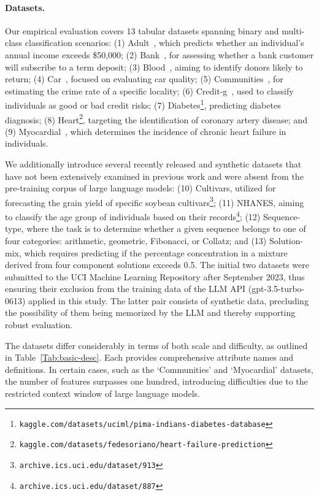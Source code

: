 \paragraph{Datasets.}
Our empirical evaluation covers 13 tabular datasets spanning binary and multi-class classification scenarios: (1) Adult~\cite{asuncion2007uci}, which predicts whether an individual’s annual income exceeds \$50,000; (2) Bank~\cite{moro2014data}, for assessing whether a bank customer will subscribe to a term deposit; (3) Blood~\cite{yeh2009knowledge}, aiming to identify donors likely to return; (4) Car~\cite{kadra2021well}, focused on evaluating car quality; (5) Communities~\cite{misc_communities_and_crime_183}, for estimating the crime rate of a specific locality; (6) Credit-g~\cite{kadra2021well}, used to classify individuals as good or bad credit risks; (7) Diabetes\footnote{\texttt{kaggle.com/datasets/uciml/pima-indians-diabetes-database}}, predicting diabetes diagnosis; (8) Heart\footnote{\texttt{kaggle.com/datasets/fedesoriano/heart-failure-prediction}}, targeting the identification of coronary artery disease; and (9) Myocardial~\cite{misc_myocardial_infarction_complications_579}, which determines the incidence of chronic heart failure in individuals.

We additionally introduce several recently released and synthetic datasets that have not been extensively examined in previous work and were absent from the pre-training corpus of large language models: (10) Cultivars, utilized for forecasting the grain yield of specific soybean cultivars\footnote{\texttt{archive.ics.uci.edu/dataset/913}}; (11) NHANES, aiming to classify the age group of individuals based on their records\footnote{\texttt{archive.ics.uci.edu/dataset/887}}; (12) Sequence-type, where the task is to determine whether a given sequence belongs to one of four categories: arithmetic, geometric, Fibonacci, or Collatz; and (13) Solution-mix, which requires predicting if the percentage concentration in a mixture derived from four component solutions exceeds 0.5. The initial two datasets were submitted to the UCI Machine Learning Repository after September 2023, thus ensuring their exclusion from the training data of the LLM API (gpt-3.5-turbo-0613) applied in this study. The latter pair consists of synthetic data, precluding the possibility of them being memorized by the LLM and thereby supporting robust evaluation.

The datasets differ considerably in terms of both scale and difficulty, as outlined in Table~\ref{Tab:basic-desc}.
Each provides comprehensive attribute names and definitions. In certain cases, such as the `Communities' and `Myocardial' datasets, the number of features surpasses one hundred, introducing difficulties due to the restricted context window of large language models.

